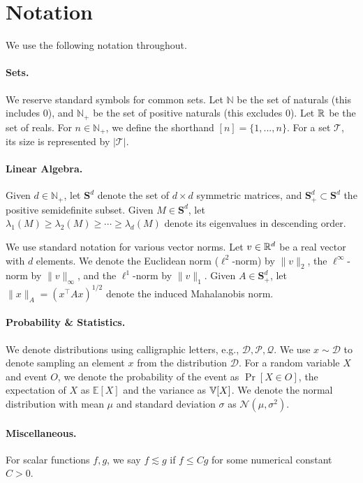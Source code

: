 \newpage
\section*{Notation}
We use the following notation throughout.

\paragraph{Sets.} 
We reserve standard symbols for common sets.
Let $\mathbb{N}$ be the set of naturals (this includes 0), and $\mathbb{N}_+$ be the set of positive naturals (this excludes 0).
Let $\mathbb{R}$ be the set of reals.
For $n \in \mathbb{N}_+$, we define the shorthand $[n] = \{1, . . . , n\}$.
For a set $\mathcal{T}$, its size is represented by $|\mathcal{T}|$.

\paragraph{Linear Algebra.}
Given $d \in \mathbb{N}_+$, 
let $\mathbf{S}^d$ denote the set of $d \times d$ symmetric matrices, and $\mathbf{S}^d_+ \subset \mathbf{S}^d$ the positive semidefinite subset. 
Given $M \in \mathbf{S}^d$, let $\lambda_1(M) \ge \lambda_2(M) \ge \cdots \ge \lambda_d(M)$ denote its eigenvalues in descending order.

We use standard notation for various vector norms.
Let $v\in \mathbb{R}^d$ be a real vector with $d$ elements. 
We denote the Euclidean norm ($\ell^2$-norm) by $\|v\|_2$, 
the $\ell^\infty$-norm by $\|v\|_\infty$, and the $\ell^1$-norm by $\|v\|_1$.
Given $A \in \mathbf{S}^d_+$, let $\| x \|_A = (x^\top A x)^{1/2}$ denote the induced Mahalanobis norm.

\paragraph{Probability \& Statistics.}
We denote distributions using calligraphic letters, e.g., $\mathcal{D}, \mathcal{P}, \mathcal{Q}$. We use $x \sim \mathcal{D}$ to denote sampling an element $x$ from the distribution $\mathcal{D}$. For a random variable $X$ and event $O$, we denote the probability of the event as $\operatorname{Pr}[X\in O]$, the expectation of $X$ as $\mathbb{E}[X]$ and the variance as $\mathbb{V}[X]$. We denote the normal distribution with mean $\mu$ and standard deviation $\sigma$ as $\mathcal{N}\left(\mu, \sigma^2\right)$.

\paragraph{Miscellaneous.}
For scalar functions $f, g$, we say $f \lesssim g$ if $f \leq C g$ for some numerical constant $C>0$. 
